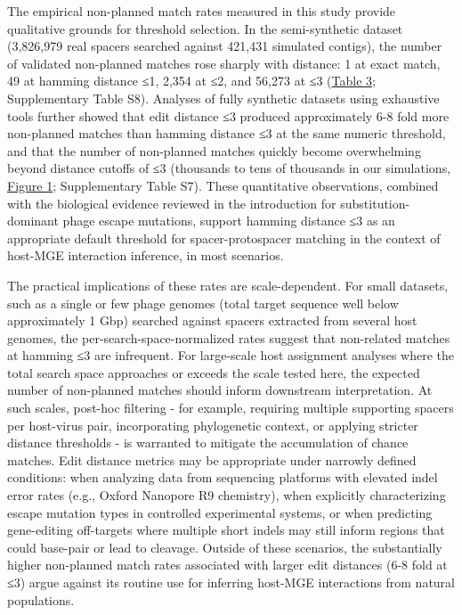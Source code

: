 \documentclass[
]{article}
\begin{document}
The empirical non-planned match rates measured in this study provide
qualitative grounds for threshold selection. In the semi-synthetic
dataset (3,826,979 real spacers searched against 421,431 simulated
contigs), the number of validated non-planned matches rose sharply with
distance: 1 at exact match, 49 at hamming distance ≤1, 2,354 at ≤2, and
56,273 at ≤3 (\hyperref[tbl-semisynthetic-hamming3]{Table 3};
Supplementary Table S8). Analyses of fully synthetic datasets using
exhaustive tools further showed that edit distance ≤3 produced
approximately 6-8 fold more non-planned matches than hamming distance ≤3
at the same numeric threshold, and that the number of non-planned
matches quickly become overwhelming beyond distance cutoffs of ≤3
(thousands to tens of thousands in our simulations,
\hyperref[fig-background-normalization]{Figure 1}; Supplementary Table
S7). These quantitative observations, combined with the biological
evidence reviewed in the introduction for substitution-dominant phage
escape
mutations\autocite{Deveau2008,Semenova2011,Fineran2014,Schelling2023},
support hamming distance ≤3 as an appropriate default threshold for
spacer-protospacer matching in the context of host-MGE interaction
inference, in most scenarios.

The practical implications of these rates are scale-dependent. For small
datasets, such as a single or few phage genomes (total target sequence
well below approximately 1 Gbp) searched against spacers extracted from
several host genomes, the per-search-space-normalized rates suggest that
non-related matches at hamming ≤3 are infrequent. For large-scale host
assignment analyses where the total search space approaches or exceeds
the scale tested here, the expected number of non-planned matches should
inform downstream interpretation. At such scales, post-hoc filtering -
for example, requiring multiple supporting spacers per host-virus pair,
incorporating phylogenetic context, or applying stricter distance
thresholds - is warranted to mitigate the accumulation of chance
matches. Edit distance metrics may be appropriate under narrowly defined
conditions: when analyzing data from sequencing platforms with elevated
indel error rates (e.g., Oxford Nanopore R9 chemistry), when explicitly
characterizing escape mutation types in controlled experimental systems,
or when predicting gene-editing off-targets where multiple short indels
may still inform regions that could base-pair or lead to cleavage.
Outside of these scenarios, the substantially higher non-planned match
rates associated with larger edit distances (6-8 fold at ≤3) argue
against its routine use for inferring host-MGE interactions from natural
populations.
\end{document}
